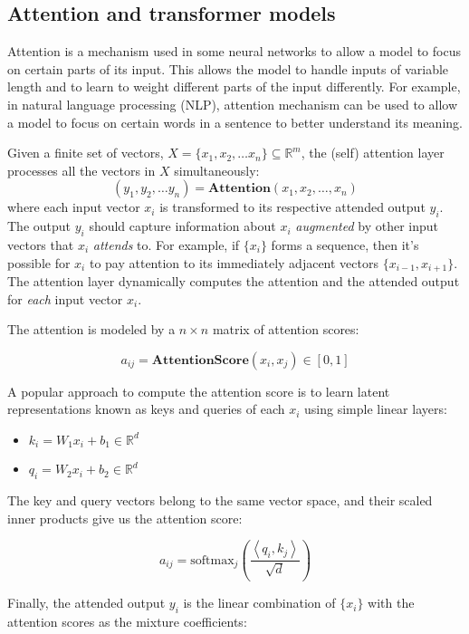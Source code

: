 \subsection{Attention and transformer models}
\label{sec:transformer}
Attention is a mechanism used in some neural networks to allow a model to focus on certain parts of its input. This allows the model to handle inputs of variable length and to learn to weight different parts of the input differently. For example, in natural language processing (NLP), attention mechanism can be used to allow a model to focus on certain words in a sentence to better understand its meaning.  

Given a finite set of vectors, $X = \{x_1, x_2, \dots x_n\}\subseteq\mathbb{R}^m$, the (self) attention layer processes all the vectors in $X$ simultaneously: 
$$
(y_1, y_2, \dots y_n) = \mathbf{Attention}(x_1, x_2, \dots, x_n)
$$
where each input vector $x_i$ is transformed to its respective attended output $y_i$.  The output $y_i$
should capture information about $x_i$ {\em augmented} by other input vectors that $x_i$ {\em attends} to.
For example, if $\{x_i\}$ forms a sequence, then it's possible for $x_i$ to pay attention to 
its immediately adjacent vectors $\{x_{i-1}, x_{i+1}\}$.  The attention layer dynamically computes
the attention and the attended output for {\em each} input vector $x_i$.

The attention is modeled by a $n\times n$ matrix of attention scores:

$$
a_{ij} = \mathbf{AttentionScore}(x_i, x_j)\in[0, 1]
$$

A popular approach to compute the attention score is to learn latent representations known as keys and queries of each $x_i$ using simple linear layers:

\begin{itemize}
    \item $k_i = W_1 x_i + b_1 \in\mathbb{R}^d$
    \item $q_i = W_2 x_i + b_2 \in\mathbb{R}^d$
\end{itemize}

The key and query vectors belong to the same vector space, and their scaled inner products
give us the attention score:

$$
a_{ij} = \mathrm{softmax}_{j}\left(\frac{\left<q_i, k_j\right>}{\sqrt{d}}\right)
$$

Finally, the attended output $y_i$ is the linear combination of $\{x_i\}$ with the attention scores
as the mixture coefficients:

